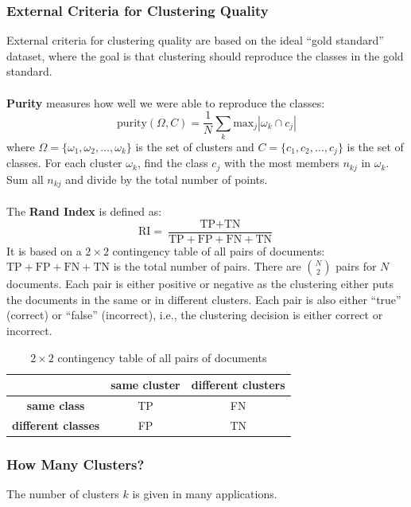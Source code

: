 \documentclass[a4paper,11pt]{article}
\begin{document}
\subsubsection{External Criteria for Clustering Quality}
External criteria for clustering quality are based on the ideal ``gold standard'' dataset, where the goal is that clustering should reproduce the classes in the gold standard.
\\\\
\textbf{Purity} measures how well we were able to reproduce the classes:
\[
    \text{purity}(\Omega, C) = \frac{1}{N} \sum_k \text{max}_j | \omega_k \cap c_j |
\]
where $\Omega = \{ \omega_1, \omega_2, \dots, \omega_k \}$ is the set of clusters and $C = \{ c_1, c_2, \dots, c_j \}$ is the set of classes.
For each cluster $\omega_k$, find the class $c_j$ with the most members $n_{kj}$
in $\omega_k$.
Sum all $n_{kj}$ and divide by the total number of points.
\\\\
The \textbf{Rand Index} is defined as:
\[
    \text{RI} = \frac{ \text{TP} + \text{TN} }{ \text{TP} + \text{FP} + \text{FN} + \text{TN} }
\]
It is based on a $2 \times 2$ contingency table of all pairs of documents:
$\text{TP} + \text{FP} + \text{FN} + \text{TN}$ is the total number of pairs.
There are $\binom{N}{2}$ pairs for $N$ documents.
Each pair is either positive or negative as the clustering either puts the documents in the same or in different clusters.
Each pair is also either ``true'' (correct) or ``false'' (incorrect), i.e., the clustering decision is either correct or incorrect.

\begin{table}[H]
    \centering
    \begin{tabular}{|c|c|c|}
    \hline
                                & \textbf{same cluster} & \textbf{different clusters} \\ \hline
    \textbf{same class}         & TP                    & FN         \\ \hline
    \textbf{different classes}  & FP                    & TN         \\ \hline
    \end{tabular}
    \caption{$2 \times 2$ contingency table of all pairs of documents}
\end{table}

\subsubsection{How Many Clusters?}
The number of clusters $k$ is given in many applications.
\end{document}
